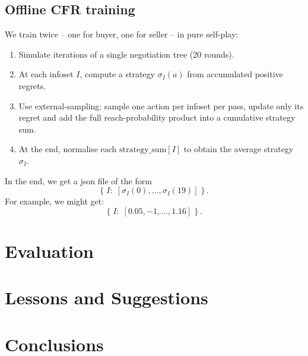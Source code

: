 \documentclass{article}
\begin{document}
\subsection{Offline CFR training}
We train twice -- one for buyer, one for seller -- in pure self-play:
\begin{enumerate}
    \item Simulate iterations of a single negotiation tree (20 rounds).
    \item At each infoset $I$, compute a strategy $\sigma_I(a)$ from accumulated positive regrets.
    \item Use external-sampling: sample one action per infoset per pass, update only its regret and add the full reach‐probability product into a cumulative strategy sum.
    \item At the end, normalise each $\mathrm{strategy\_sum}[I]$ to obtain the average strategy $\sigma_I$.
\end{enumerate}
In the end, we get a json file of the form
\[
\{\;I:\;[\sigma_I(0),\ldots,\sigma_I(19)]\;\}\,.
\]
For example, we might get: 
\[
\{\;I:\;[0.05,-1, \ldots,1.16]\;\}\,.
\]
\section{Evaluation}
\section{Lessons and Suggestions}
\section*{Conclusions}
\end{document}

